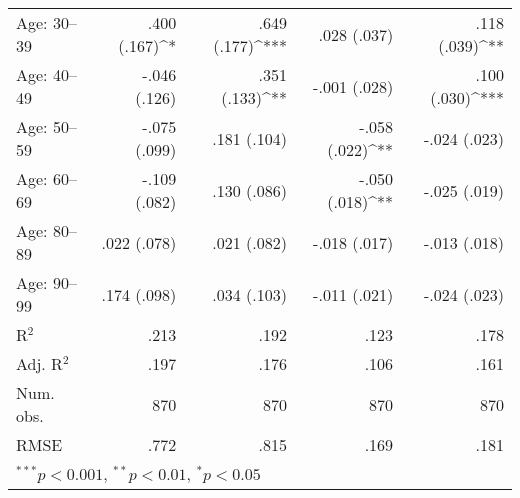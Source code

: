 \begin{tabular}{l D{)}{)}{11)3} D{)}{)}{11)3} D{)}{)}{11)3} D{)}{)}{11)3} }
Age: 30--39                           & .400 \; (.167)^{*}    & .649 \; (.177)^{***}  & .028 \; (.037)        & .118 \; (.039)^{**}   \\
Age: 40--49                           & -.046 \; (.126)       & .351 \; (.133)^{**}   & -.001 \; (.028)       & .100 \; (.030)^{***}  \\
Age: 50--59                           & -.075 \; (.099)       & .181 \; (.104)        & -.058 \; (.022)^{**}  & -.024 \; (.023)       \\
Age: 60--69                           & -.109 \; (.082)       & .130 \; (.086)        & -.050 \; (.018)^{**}  & -.025 \; (.019)       \\
Age: 80--89                           & .022 \; (.078)        & .021 \; (.082)        & -.018 \; (.017)       & -.013 \; (.018)       \\
Age: 90--99                           & .174 \; (.098)        & .034 \; (.103)        & -.011 \; (.021)       & -.024 \; (.023)       \\
\midrule
R$^2$                                 & .213                  & .192                  & .123                  & .178                  \\
Adj. R$^2$                            & .197                  & .176                  & .106                  & .161                  \\
Num. obs.                             & 870                   & 870                   & 870                   & 870                   \\
RMSE                                  & .772                  & .815                  & .169                  & .181                  \\
\bottomrule
{}
\end{tabular}

